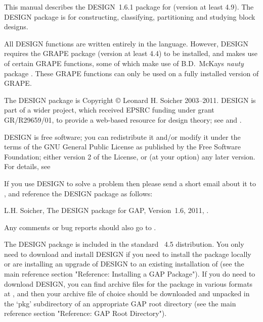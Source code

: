 %
%
%
%
\def\GRAPE{\sf GRAPE}
\def\DESIGN{\sf DESIGN}
\def\GAPDoc{\sf GAPDoc}
\def\nauty{\it nauty}
\def\Aut{{\rm Aut}\,} 


This manual describes the {\DESIGN}~1.6.1 package for {\GAP} (version
at least 4.9).  The {\DESIGN} package is for constructing, classifying,
partitioning and studying block designs.

All {\DESIGN} functions are written entirely in the {\GAP} language.
However, {\DESIGN} requires the {\GRAPE} package \cite{Grape} (version
at least 4.4) to be installed, and makes use of certain {\GRAPE}
functions, some of which make use of B.D.~McKay{\pif}s {\nauty} package
\cite{Nauty}. These {\GRAPE} functions can only be used on a fully
installed version of {\GRAPE}. 

The {\DESIGN} package is Copyright {\copyright} Leonard H. Soicher
2003--2011.  {\DESIGN} is part of a wider project, which received EPSRC
funding under grant GR/R29659/01, to provide a web-based resource for
design theory; see  and \cite{Dotw}.

{\DESIGN} is free software; you can redistribute it and/or modify
it under the terms of the GNU General Public License as published by
the Free Software Foundation; either version 2 of the License, or
(at your option) any later version. For details, see 

If you use {\DESIGN} to solve a problem then please send a short email
about it to , and reference the {\DESIGN} 
package as follows:

L.H. Soicher, The {DESIGN} package for {GAP}, Version~1.6, 2011,
.

Any comments or bug reports should also go to
.


The {\DESIGN} package is included in the standard {\GAP}~4.5
distribution. You only need to download and install {\DESIGN} if you need
to install the package locally or are installing an upgrade of {\DESIGN}
to an existing installation of {\GAP} (see the main {\GAP} reference
section "Reference: Installing a GAP Package").  If you do need to download
{\DESIGN}, you can find archive files for the package in various formats
at , and then your
archive file of choice should be downloaded and unpacked in the `pkg'
subdirectory of an appropriate GAP root directory (see the main {\GAP}
reference section "Reference: GAP Root Directory").

